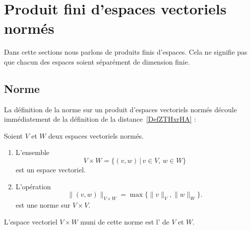 \section{Produit fini d'espaces vectoriels normés}
\label{sec_prod}

Dans cette sections nous parlons de produits finis d'espaces. Cela ne signifie pas que chacun des espaces soient séparément de dimension finie.

\subsection{Norme}

La définition de la norme sur un produit d'espaces vectoriels normés découle immédiatement de la définition de la distance~\ref{DefZTHxrHA} :
\begin{lemmaDef}  \label{DefFAJgTCE}
    Soient $V$ et $W$ deux espaces vectoriels normés. 
    \begin{enumerate}
        \item
            L'ensemble
            \begin{equation}
            V\times W=\{(v,w)\,|\, v\in V,\, w\in W\}
            \end{equation}
            est un espace vectoriel.
        \item 
            L'opération
            \begin{equation}	\label{EqNormeVxWmax}
                \|(v,w) \|_{V\times W}=\max\{\|v\|_{V},\|w\|_W\}.
            \end{equation}
            est une norme sur \( V\times V\).
            
    \end{enumerate}
    L'espace vectoriel \( V\times W\) muni de cette norme est l' de $V$ et $W$.
\end{lemmaDef}

